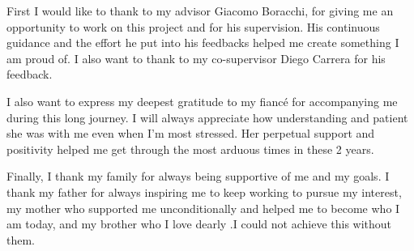 

\begingroup

First I would like to thank to my advisor Giacomo Boracchi, for giving me an opportunity to work on this 
project and for his supervision. His continuous guidance and the effort he put into his feedbacks helped me create 
something I am proud of. I also want to thank to my co-supervisor Diego Carrera for his feedback.

I also want to express my deepest gratitude to my fianc\'e for accompanying me during this long journey. 
I will always appreciate how understanding and patient she was with me even when I'm most stressed.
Her perpetual support and positivity helped me get through the most arduous times in these 2 years. 

Finally, I thank my family for always being supportive of me and my goals. I thank my father for always 
inspiring me to keep working to pursue my interest, my mother who supported me unconditionally and helped me to 
become who I am today, and my brother who I love dearly  .I could not achieve this without them.

\endgroup
